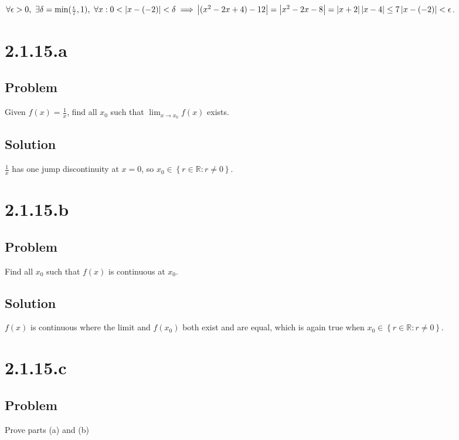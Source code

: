 \documentclass[12pt]{article}
\newcommand{\curly}[1]{\left\{      #1 \right\}     }
\newcommand{\abs}  [1]{\left|       #1 \right|      }
\begin{document}
$\forall \epsilon > 0,\ \exists \delta = \min(\frac{\epsilon}{7}, 1),\ \forall x : 0 < \abs{x - (-2)} < \delta \implies \\ \abs{(x^2 - 2x + 4) - 12} = \abs{x^2 - 2x - 8} = \abs{x + 2} \abs{x - 4} \leq 7 \abs{x - (-2)} < \epsilon$.



\section*{2.1.15.a}

\subsection*{Problem}
Given $f(x) = \frac{1}{x}$, find all $x_0$ such that $\lim_{x \to x_0} f(x)$ exists.

\subsection*{Solution}
$\frac{1}{x}$ has one jump discontinuity at $x = 0$, so $x_0 \in \curly{r \in \mathbb{R} : r \neq 0}$.



\section*{2.1.15.b}

\subsection*{Problem}
Find all $x_0$ such that $f(x)$ is continuous at $x_0$.

\subsection*{Solution}
$f(x)$ is continuous where the limit and $f(x_0)$ both exist and are equal, which is again true when $x_0 \in \curly{r \in \mathbb{R} : r \neq 0}$.



\section*{2.1.15.c}

\subsection*{Problem}
Prove parts (a) and (b)
\end{document}

